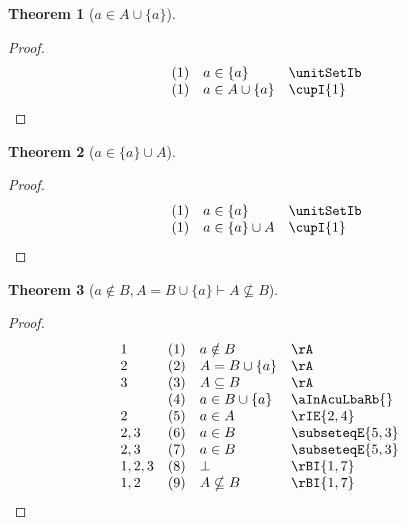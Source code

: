 \documentclass{book}
\theoremstyle{plain}
\newtheorem{theorem}{Theorem}
\theoremstyle{remark}
\theoremstyle{definition}
\begin{document}
\label{aInAcuLbaRb}
\begin{theorem}[\(a\in A\cup\{a\}\)]
\end{theorem}
\begin{proof}
    \[
	\begin{array}{llll}
		& (1) & a\in\{a\} & \unitSetIb \\
		& (1) & a\in A\cup\{a\} & \cupI{1} \\
	\end{array}
    \]
\end{proof}

\label{aInLbaRbcuA}
\begin{theorem}[\(a\in \{a\}\cup A\)]
\end{theorem}
\begin{proof}
    \[
	\begin{array}{llll}
		& (1) & a\in\{a\} & \unitSetIb \\
		& (1) & a\in\{a\}\cup A & \cupI{1} \\
	\end{array}
    \]
\end{proof}

\label{aNotinBwAEqualsBcuLbaRbImpANsubseteqB}
\begin{theorem}[\(a\notin B, A=B\cup \{a\}\vdash A\nsubseteq B\)]
\end{theorem}
\begin{proof}
	\[
	\begin{array}{llll}
		1 & (1) & a\notin B & \rA \\
		2 & (2) & A=B\cup \{a\} & \rA \\
		3 & (3) & A\subseteq B & \rA \\
		& (4) & a\in B\cup \{a\} & \aInAcuLbaRb{} \\
		2 & (5) & a\in A & \rIE{2,4} \\
		2,3 & (6) & a\in B & \subseteqE{5,3} \\
		2,3 & (7) & a\in B & \subseteqE{5,3} \\
		1,2,3 & (8) & \bot & \rBI{1,7} \\
		1,2 & (9) & A\nsubseteq B & \rBI{1,7} \\
	\end{array}
	\]
\end{proof}
\end{document}
